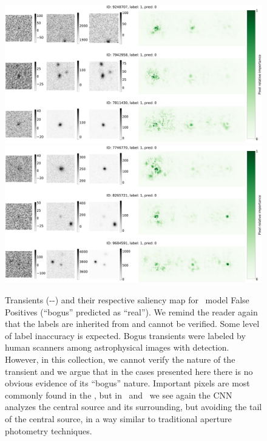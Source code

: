 \begin{figure}
    \centering
    \includegraphics[width=0.8\linewidth]{
    figures/saliency_plot_other3FP-see21.pdf}
    \includegraphics[width=0.8\linewidth]{
    figures/saliency_plot_other3FP-see369.pdf}
    \caption{Transients (\diff-\search-\temp) and their respective saliency map for \diabased\ model False Positives (``bogus'' predicted as ``real'').  We remind the reader again that the labels are inherited from  \citet{Goldstein_2015} and cannot be verified.  Some level of label inaccuracy is expected. Bogus transients were labeled by human scanners among astrophysical images with detection. However, in this collection, we cannot verify the nature of the transient and we argue that in the cases presented here there is no obvious evidence of its ``bogus'' nature. Important pixels are most commonly found in the \diff, but in \temp\ and \search\ we see again the CNN analyzes the central source and its surrounding, but avoiding the tail of the central source, in a way similar to traditional aperture photometry techniques.}
    \label{fig:saliency_dia3id_FP}
\end{figure}

